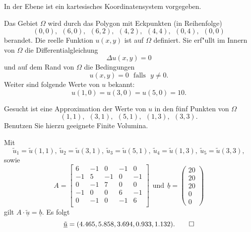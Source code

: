 In der Ebene ist ein kartesisches Koordinatensystem vorgegeben. 

Das Gebiet $\Omega$ wird durch das Polygon mit Eckpunkten (in Reihenfolge)
\[
(0,0), \ \ (6,0), \ \ (6,2), \ \ (4,2),  \ \ (4,4),  \ \ (0,4), \ \  (0,0)
\]
berandet. Die reelle Funktion $u(x,y)$ ist auf $\Omega$ definiert.
Sie erf"ullt im Innern von $\Omega$ die Differentialgleichung
\[
\Delta u(x,y) = 0
\]
und auf dem Rand von $\Omega$ die Bedingungen
\[
u(x,y) = 0 \ \ \ \text{falls} \ \ \ y \neq 0.
\]
Weiter sind folgende Werte von $u$ bekannt:
\[
u(1,0) = u(3,0) = u(5,0) = 10.
\]

Gesucht ist eine Approximation der Werte von $u$ in den f\"unf Punkten
von $\Omega$
\[
(1,1), \ \  (3,1), \ \ (5,1), \ \  (1,3), \ \ (3,3).
\]
Benutzen Sie hierzu geeignete Finite Volumina.  

\begin{loesung}
Mit 
\[
\tilde u_1 = \tilde u(1,1), \ \tilde u_2 = \tilde u(3,1), \ \tilde u_3 = \tilde u(5,1), \ \tilde u_4 = \tilde u(1,3), \ \tilde u_5 = \tilde u(3,3), 
\]
sowie 
\[
A = \left[\begin{array}{rrrrr} 
6 & -1 & 0 & -1 & 0 \\
-1 & 5 & -1 & 0 & -1 \\
0 & -1 & 7 & 0 & 0 \\ 
-1 & 0 & 0 & 6 & -1 \\
0 & -1 & 0 & -1 & 6 \\
 \end{array}\right] \ \ \text{und} \ \
\underline{b} =  \left(\begin{array}{r} 20 \\ 20 \\ 20 \\ 0 \\ 0 \end{array}\right)
\]
gilt $A \cdot \underline{\tilde u} = \underline{b}.$ 
Es folgt 
\[
\underline{\tilde u} = (4.465, 5.858, 3.694, 0.933, 1.132).
\qedhere
\]
\end{loesung}

